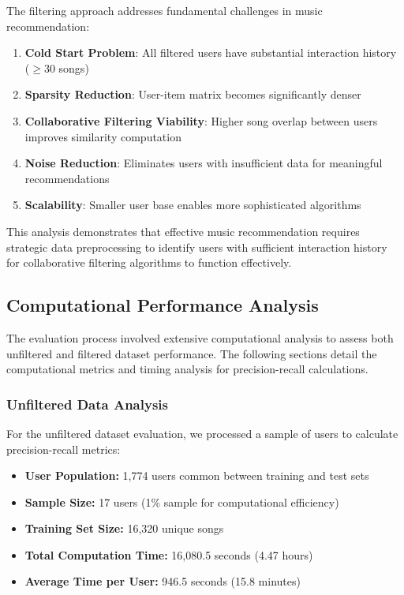 \documentclass[12pt,a4paper]{article}
\begin{document}
The filtering approach addresses fundamental challenges in music recommendation:

\begin{enumerate}
    \item \textbf{Cold Start Problem}: All filtered users have substantial interaction history ($\geq$30 songs)
    \item \textbf{Sparsity Reduction}: User-item matrix becomes significantly denser
    \item \textbf{Collaborative Filtering Viability}: Higher song overlap between users improves similarity computation
    \item \textbf{Noise Reduction}: Eliminates users with insufficient data for meaningful recommendations
    \item \textbf{Scalability}: Smaller user base enables more sophisticated algorithms
\end{enumerate}

This analysis demonstrates that effective music recommendation requires strategic data preprocessing to identify users with sufficient interaction history for collaborative filtering algorithms to function effectively.

\subsection{Computational Performance Analysis}

The evaluation process involved extensive computational analysis to assess both unfiltered and filtered dataset performance. The following sections detail the computational metrics and timing analysis for precision-recall calculations.

\subsubsection{Unfiltered Data Analysis}

For the unfiltered dataset evaluation, we processed a sample of users to calculate precision-recall metrics:

\begin{itemize}
    \item \textbf{User Population:} 1,774 users common between training and test sets
    \item \textbf{Sample Size:} 17 users (1\% sample for computational efficiency)
    \item \textbf{Training Set Size:} 16,320 unique songs
    \item \textbf{Total Computation Time:} 16,080.5 seconds (4.47 hours)
    \item \textbf{Average Time per User:} 946.5 seconds (15.8 minutes)
\end{itemize}
\end{document}
